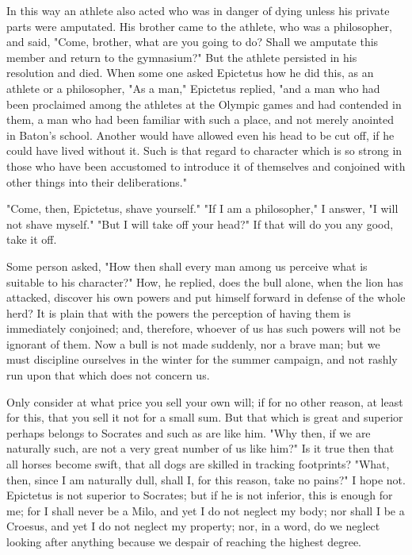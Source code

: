 \documentclass[a4paper]{article}
\begin{document}
In this way an athlete also acted who was in danger of dying unless
his private parts were amputated. His brother came to the athlete,
who was a philosopher, and said, "Come, brother, what are you going
to do? Shall we amputate this member and return to the gymnasium?"
But the athlete persisted in his resolution and died. When some one
asked Epictetus how he did this, as an athlete or a philosopher, "As
a man," Epictetus replied, "and a man who had been proclaimed among
the athletes at the Olympic games and had contended in them, a man
who had been familiar with such a place, and not merely anointed in
Baton's school. Another would have allowed even his head to be cut
off, if he could have lived without it. Such is that regard to character
which is so strong in those who have been accustomed to introduce
it of themselves and conjoined with other things into their deliberations."

"Come, then, Epictetus, shave yourself." "If I am a philosopher,"
I answer, "I will not shave myself." "But I will take off your head?"
If that will do you any good, take it off. 

Some person asked, "How then shall every man among us perceive what
is suitable to his character?" How, he replied, does the bull alone,
when the lion has attacked, discover his own powers and put himself
forward in defense of the whole herd? It is plain that with the powers
the perception of having them is immediately conjoined; and, therefore,
whoever of us has such powers will not be ignorant of them. Now a
bull is not made suddenly, nor a brave man; but we must discipline
ourselves in the winter for the summer campaign, and not rashly run
upon that which does not concern us. 

Only consider at what price you sell your own will; if for no other
reason, at least for this, that you sell it not for a small sum. But
that which is great and superior perhaps belongs to Socrates and such
as are like him. "Why then, if we are naturally such, are not a very
great number of us like him?" Is it true then that all horses become
swift, that all dogs are skilled in tracking footprints? "What, then,
since I am naturally dull, shall I, for this reason, take no pains?"
I hope not. Epictetus is not superior to Socrates; but if he is not
inferior, this is enough for me; for I shall never be a Milo, and
yet I do not neglect my body; nor shall I be a Croesus, and yet I
do not neglect my property; nor, in a word, do we neglect looking
after anything because we despair of reaching the highest degree.
\end{document}
